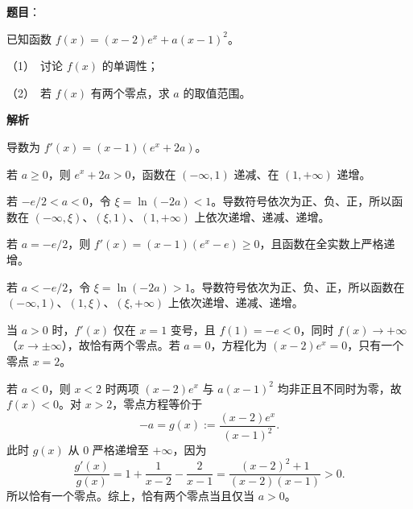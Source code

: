 \begin{answer}

\textbf{题目}：

已知函数 \(f(x)=(x-2)e^x+a(x-1)^2\)。

   （1）　讨论 \(f(x)\) 的单调性；

   （2）　若 \(f(x)\) 有两个零点，求 \(a\) 的取值范围。

\textbf{解析}

导数为 \(f'(x)=(x-1)(e^x+2a)\)。


若 \(a\ge0\)，则 \(e^x+2a>0\)，函数在 \((-\infty,1)\) 递减、在 \((1,+\infty)\) 递增。

若 \(-e/2<a<0\)，令 \(\xi=\ln(-2a)<1\)。导数符号依次为正、负、正，所以函数在 \((-\infty,\xi)\)、\((\xi,1)\)、\((1,+\infty)\) 上依次递增、递减、递增。

若 \(a=-e/2\)，则 \(f'(x)=(x-1)(e^x-e)\ge0\)，且函数在全实数上严格递增。

若 \(a<-e/2\)，令 \(\xi=\ln(-2a)>1\)。导数符号依次为正、负、正，所以函数在 \((-\infty,1)\)、\((1,\xi)\)、\((\xi,+\infty)\) 上依次递增、递减、递增。


当 \(a>0\) 时，\(f'(x)\) 仅在 \(x=1\) 变号，且 \(f(1)=-e<0\)，同时 \(f(x)\to+\infty\)（\(x\to\pm\infty\)），故恰有两个零点。若 \(a=0\)，方程化为 \((x-2)e^x=0\)，只有一个零点 \(x=2\)。

若 \(a<0\)，则 \(x<2\) 时两项 \((x-2)e^x\) 与 \(a(x-1)^2\) 均非正且不同时为零，故 \(f(x)<0\)。对 \(x>2\)，零点方程等价于
\nopagebreak[4]
\[
-a=g(x):=\frac{(x-2)e^x}{(x-1)^2}.
\]
此时 \(g(x)\) 从 \(0\) 严格递增至 \(+\infty\)，因为
\nopagebreak[4]
\[
\frac{g'(x)}{g(x)}=1+\frac1{x-2}-\frac2{x-1}
=\frac{(x-2)^2+1}{(x-2)(x-1)}>0.
\]
所以恰有一个零点。综上，恰有两个零点当且仅当 \(a>0\)。



\end{answer}
